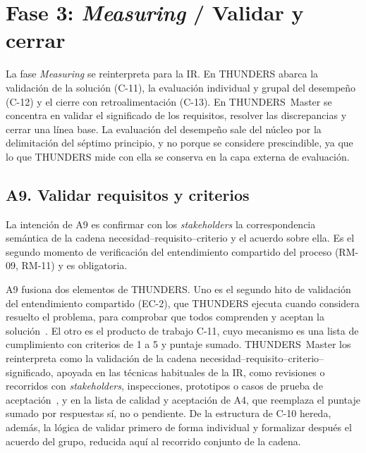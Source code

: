 \documentclass[12pt,letterpaper,oneside]{report}
\begin{document}
\section{Fase 3: \textit{Measuring} / Validar y cerrar}
\label{sec:fase3}
La fase \textit{Measuring} se reinterpreta para la IR. En THUNDERS abarca la
validación de la solución (C-11), la evaluación individual y grupal del
desempeño (C-12) y el cierre con retroalimentación (C-13). En THUNDERS~Master se
concentra en validar el significado de los requisitos, resolver las
discrepancias y cerrar una línea base. La evaluación del desempeño sale del
núcleo por la delimitación del séptimo principio, y no porque se considere
prescindible, ya que lo que THUNDERS mide con ella se conserva en la capa
externa de evaluación.

\subsection{A9. Validar requisitos y criterios}
La intención de A9 es confirmar con los \textit{stakeholders} la
correspondencia semántica de la cadena necesidad--requisito--criterio y el
acuerdo sobre ella. Es el segundo momento de verificación del entendimiento
compartido del proceso (RM-09, RM-11) y es obligatoria.

A9 fusiona dos elementos de THUNDERS. Uno es el segundo hito de validación del
entendimiento compartido (EC-2), que THUNDERS ejecuta cuando considera resuelto el
problema, para comprobar que todos comprenden y aceptan la
solución~\cite{agredo2022thesis}. El otro es el producto de trabajo C-11, cuyo mecanismo
es una lista de cumplimiento con criterios de 1 a 5 y puntaje sumado.
THUNDERS~Master los reinterpreta como la validación de la cadena
necesidad--requisito--criterio--significado, apoyada en las técnicas habituales
de la IR, como revisiones o recorridos con \textit{stakeholders}, inspecciones,
prototipos o casos de prueba de aceptación~\cite{iso29148}, y en la lista de
calidad y aceptación de A4, que reemplaza el puntaje sumado por respuestas sí,
no o pendiente. De la estructura de C-10 hereda, además, la lógica de validar
primero de forma individual y formalizar después el acuerdo del grupo, reducida
aquí al recorrido conjunto de la cadena.
\end{document}
